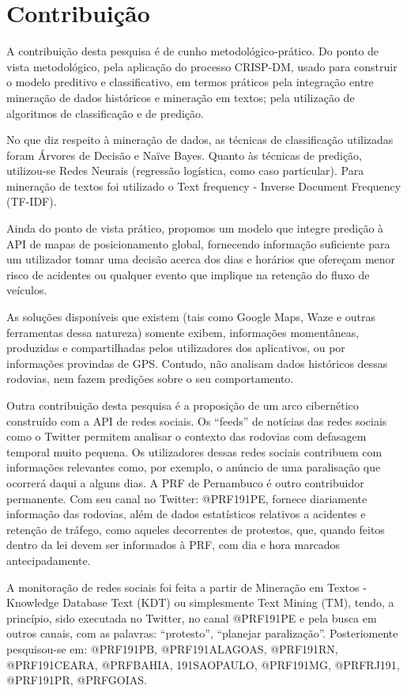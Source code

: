 \chapter{Contribuição}\label{meto}

A contribuição desta pesquisa é de cunho metodológico-prático.
Do ponto de vista metodológico, pela aplicação do processo CRISP-DM, usado para construir o modelo preditivo e classificativo, em termos práticos pela integração entre mineração de dados históricos e mineração em textos; pela utilização de algoritmos de classificação e de predição. 

No que diz respeito à mineração de dados, as técnicas de classificação utilizadas foram Árvores de Decisão e Naïve Bayes. Quanto às técnicas de predição, utilizou-se Redes Neurais (regressão logística, como caso particular). Para mineração de textos foi utilizado o Text frequency - Inverse Document Frequency (TF-IDF).

Ainda do ponto de vista prático, propomos um modelo que integre predição à API de mapas de posicionamento global, fornecendo informação suficiente para um utilizador tomar uma decisão acerca dos dias e horários que ofereçam menor risco de acidentes ou qualquer evento que implique na retenção do fluxo de veículos. 

As soluções disponíveis que existem (tais como Google Maps, Waze e outras ferramentas dessa natureza) somente exibem, informações momentâneas, produzidas e compartilhadas pelos utilizadores dos aplicativos, ou por informações provindas de GPS. Contudo, não analisam dados históricos dessas rodovias, nem fazem predições sobre o seu comportamento.

Outra contribuição desta pesquisa é a proposição de um arco cibernético construído com a API de redes sociais.
Os ``feeds'' de notícias das redes sociais como o Twitter permitem analisar o contexto das rodovias com defasagem temporal muito pequena.
Os utilizadores dessas redes sociais contribuem com informações relevantes como, por exemplo, o anúncio de uma paralisação que ocorrerá 
daqui a alguns dias. A PRF de Pernambuco é outro contribuidor permanente. Com seu canal no Twitter: @PRF191PE, fornece diariamente informação das rodovias, 
além de dados estatísticos relativos a acidentes e retenção de tráfego, como aqueles decorrentes de protestos, que, quando feitos dentro da lei
devem ser informados à PRF, com dia e hora marcados antecipadamente.

A monitoração de redes sociais foi feita a partir de Mineração em Textos - Knowledge Database Text (KDT) ou simplesmente Text Mining (TM), tendo, a princípio, sido executada no Twitter, no canal @PRF191PE e pela busca em outros canais, com as palavras: ``protesto'', ``planejar paralização''. Posteriomente pesquisou-se em: @PRF191PB, @PRF191ALAGOAS, @PRF191RN, @PRF191CEARA, @PRFBAHIA, 191SAOPAULO, @PRF191MG, @PRFRJ191, @PRF191PR, @PRFGOIAS. 

